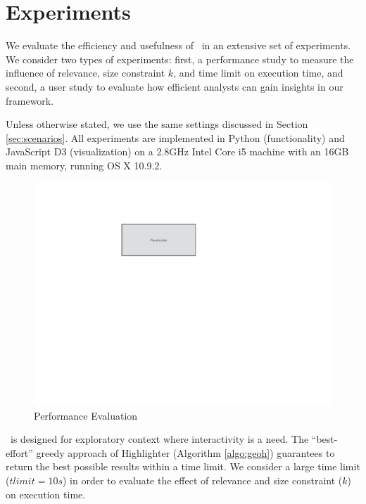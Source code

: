 \section{Experiments}
\label{sec:exp}
We evaluate the efficiency and usefulness of \framework\ in an extensive set of experiments. We consider two types of experiments: first, a performance study to measure the influence of relevance, size constraint $k$, and time limit on execution time, and second, a user study to evaluate how efficient analysts can gain insights in our framework.

\vspace{5pt}
 Unless otherwise stated, we use the same settings discussed in Section \ref{sec:scenarios}. All experiments are implemented in Python (functionality) and JavaScript D3 (visualization) on a 2.8GHz Intel Core i5 machine with an 16GB main memory, running OS X 10.9.2.

\begin{figure}
  \centering
  \includegraphics[width=\columnwidth]{figs/placeholder}
\caption{Performance Evaluation}
\label{fig:performance}
\end{figure}

\vspace{5pt}
 \framework\ is designed for exploratory context where interactivity is a need. The ``best-effort'' greedy approach of {\sc Highlighter} (Algorithm \ref{algo:geoh}) guarantees to return the best possible results within a time limit. We consider a large time limit ($tlimit = 10s$) in order to evaluate the effect of relevance and size constraint ($k$) on execution time.


